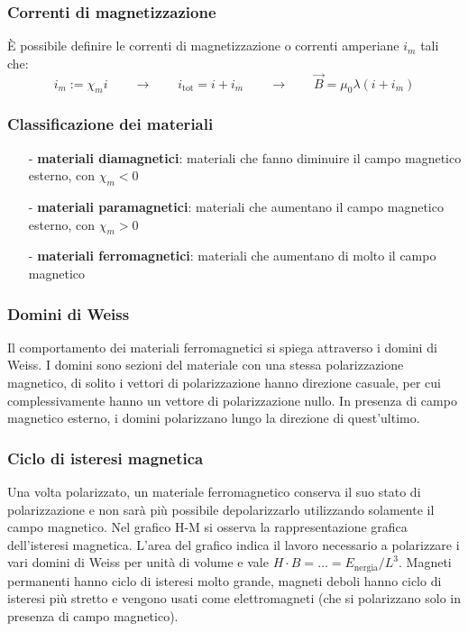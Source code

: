 \documentclass[a4paper]{article}
\begin{document}
\subsubsection*{Correnti di magnetizzazione}
È possibile definire le correnti di magnetizzazione o correnti amperiane \(i_m\) tali che:
\[i_m := \chi_m i \qquad \rightarrow \qquad i_\text{tot} = i + i_m \qquad \rightarrow \qquad \vec{B} = \mu_0 \lambda (i + i_m)\]

\subsubsection*{Classificazione dei materiali}
\begin{itemize}[topsep=3pt, itemsep=0pt]
	\item[-] \textbf{materiali diamagnetici}: materiali che fanno diminuire il campo magnetico esterno, con \(\chi_m < 0\)
	\item[-] \textbf{materiali paramagnetici}: materiali che aumentano il campo magnetico esterno, con \(\chi_m > 0\)
	\item[-] \textbf{materiali ferromagnetici}: materiali che aumentano di molto il campo magnetico
\end{itemize}

\subsubsection*{Domini di Weiss}
Il comportamento dei materiali ferromagnetici si spiega attraverso i domini di Weiss. I domini sono sezioni del materiale con una
stessa polarizzazione magnetico, di solito i vettori di polarizzazione hanno direzione casuale, per cui complessivamente hanno 
un vettore di polarizzazione nullo. In presenza di campo magnetico esterno, i domini polarizzano lungo la direzione di quest'ultimo.

\subsubsection*{Ciclo di isteresi magnetica}
Una volta polarizzato, un materiale ferromagnetico conserva il suo stato di polarizzazione e non sarà più possibile depolarizzarlo
utilizzando solamente il campo magnetico. Nel grafico H-M si osserva la rappresentazione grafica dell'isteresi magnetica. L'area
del grafico indica il lavoro necessario a polarizzare i vari domini di Weiss per unità di volume e vale \(H \cdot B = \dots = E_\text{nergia}/L^3\).
Magneti permanenti hanno ciclo di isteresi molto grande, magneti deboli hanno ciclo di isteresi più stretto e vengono usati come
elettromagneti (che si polarizzano solo in presenza di campo magnetico).
\end{document}
